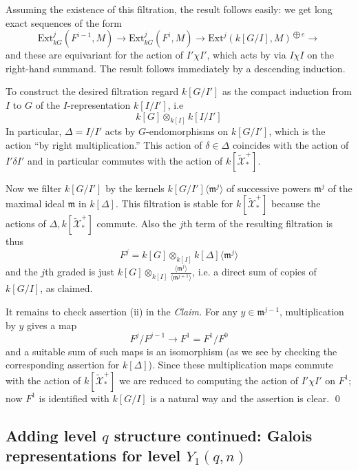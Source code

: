 \documentclass[10pt]{amsart}
\newcommand{\Ext}{\mathrm{Ext}}
\theoremstyle{remark}
\begin{document}
Assuming the existence of this filtration, the result follows easily: we get  long exact sequences  of the form $$ \Ext^j_{kG}(F^{i-1}, M) \rightarrow \Ext^j_{kG}(F^i, M) \rightarrow \Ext^j( k[G/I], M )^{\bigoplus e}  \rightarrow $$
 and these are equivariant for the action of $I' \chi I'$, which acts by via $I \chi I$ on the right-hand summand.
 The result follows immediately by a descending induction.
 
 
To construct the desired filtration regard $k[G/I']$ as the  compact induction from $I$ to $G$ of the $I$-representation $k[I/I']$, i.e
 $$k[G]\otimes_{k[I]} k[I/I'] $$
 In particular, $\Delta=I/I'$ acts  by $G$-endomorphisms on $k[G/I']$, which is the action ``by right multiplication.'' This action 
 of $\delta \in \Delta$ coincides with the action of $I' \delta I'$ and in particular 
 commutes with the action of $k[\widetilde{\mathcal{X}}_*^+]$. 
 
 Now we filter $k[G/I']$ by the kernels  $k[G/I'] \langle \mathfrak{m}^j \rangle$ of successive powers  $\mathfrak{m}^j$ of the maximal 
ideal  $\mathfrak{m}$  in $k[\Delta]$.    This filtration  is stable
for  $k[\widetilde{\mathcal{X}}_*^+]$ because the actions of $\Delta, k[\widetilde{\mathcal{X}}_*^+]$ commute. 
Also 
the $j$th term of the resulting filtration is thus
$$F^j= k[G] \otimes_{k[I]}  k[\Delta]\langle \mathfrak{m}^j \rangle$$
and the $j$th graded is just $k[G] \otimes_{k[I]} \frac{\langle  \mathfrak{m}^j \rangle}{\langle \mathfrak{m}^{j+1} \rangle}$, 
i.e. a direct sum of copies of $k[G/I]$, as claimed.

 It remains to check assertion (ii) in the {\em Claim.} For any $y \in \mathfrak{m}^{j-1}$, multiplication by $y$ gives a map
$$F^{j}/F^{j-1} \rightarrow F^1 = F^1/F^0$$
and a suitable sum of such maps is an isomorphism (as we see by checking the corresponding assertion for $k[\Delta]$). 
Since these multiplication maps commute with the action of $k[\widetilde{\mathcal{X}}_*^+]$
we are reduced to computing the action of $I' \chi I'$ on $F^1$;
now $F^1$ is identified with $k[G/I]$ is a natural way and the assertion is clear.
 \fi 
  \qed 

 
 
 
   
      \subsection{Adding level $q$ structure continued:  Galois representations for level  $Y_1(q ,n)$} \label{Lgcompat}
      
\end{document}
